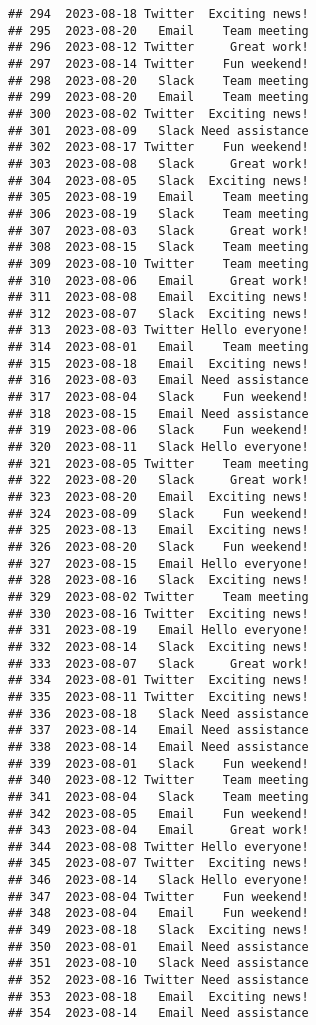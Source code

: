 \documentclass[
]{article}
\begin{document}
\begin{verbatim}
## 294  2023-08-18 Twitter  Exciting news!
## 295  2023-08-20   Email    Team meeting
## 296  2023-08-12 Twitter     Great work!
## 297  2023-08-14 Twitter    Fun weekend!
## 298  2023-08-20   Slack    Team meeting
## 299  2023-08-20   Email    Team meeting
## 300  2023-08-02 Twitter  Exciting news!
## 301  2023-08-09   Slack Need assistance
## 302  2023-08-17 Twitter    Fun weekend!
## 303  2023-08-08   Slack     Great work!
## 304  2023-08-05   Slack  Exciting news!
## 305  2023-08-19   Email    Team meeting
## 306  2023-08-19   Slack    Team meeting
## 307  2023-08-03   Slack     Great work!
## 308  2023-08-15   Slack    Team meeting
## 309  2023-08-10 Twitter    Team meeting
## 310  2023-08-06   Email     Great work!
## 311  2023-08-08   Email  Exciting news!
## 312  2023-08-07   Slack  Exciting news!
## 313  2023-08-03 Twitter Hello everyone!
## 314  2023-08-01   Email    Team meeting
## 315  2023-08-18   Email  Exciting news!
## 316  2023-08-03   Email Need assistance
## 317  2023-08-04   Slack    Fun weekend!
## 318  2023-08-15   Email Need assistance
## 319  2023-08-06   Slack    Fun weekend!
## 320  2023-08-11   Slack Hello everyone!
## 321  2023-08-05 Twitter    Team meeting
## 322  2023-08-20   Slack     Great work!
## 323  2023-08-20   Email  Exciting news!
## 324  2023-08-09   Slack    Fun weekend!
## 325  2023-08-13   Email  Exciting news!
## 326  2023-08-20   Slack    Fun weekend!
## 327  2023-08-15   Email Hello everyone!
## 328  2023-08-16   Slack  Exciting news!
## 329  2023-08-02 Twitter    Team meeting
## 330  2023-08-16 Twitter  Exciting news!
## 331  2023-08-19   Email Hello everyone!
## 332  2023-08-14   Slack  Exciting news!
## 333  2023-08-07   Slack     Great work!
## 334  2023-08-01 Twitter  Exciting news!
## 335  2023-08-11 Twitter  Exciting news!
## 336  2023-08-18   Slack Need assistance
## 337  2023-08-14   Email Need assistance
## 338  2023-08-14   Email Need assistance
## 339  2023-08-01   Slack    Fun weekend!
## 340  2023-08-12 Twitter    Team meeting
## 341  2023-08-04   Slack    Team meeting
## 342  2023-08-05   Email    Fun weekend!
## 343  2023-08-04   Email     Great work!
## 344  2023-08-08 Twitter Hello everyone!
## 345  2023-08-07 Twitter  Exciting news!
## 346  2023-08-14   Slack Hello everyone!
## 347  2023-08-04 Twitter    Fun weekend!
## 348  2023-08-04   Email    Fun weekend!
## 349  2023-08-18   Slack  Exciting news!
## 350  2023-08-01   Email Need assistance
## 351  2023-08-10   Slack Need assistance
## 352  2023-08-16 Twitter Need assistance
## 353  2023-08-18   Email  Exciting news!
## 354  2023-08-14   Email Need assistance

\end{verbatim}
\end{document}
